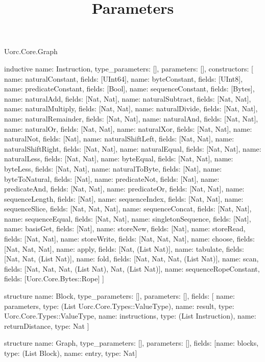 \begin{lexlean}{Uorc.Core.Graph}
\title{Parameters}
\begin{semanticmodule}
inductive{
  name: Instruction,
  type_parameters: [],
  parameters: [],
  constructors: [
    {name: naturalConstant, fields: [UInt64]},
    {name: byteConstant, fields: [UInt8]},
    {name: predicateConstant, fields: [Bool]},
    {name: sequenceConstant, fields: [Bytes]},
    {name: naturalAdd, fields: [Nat, Nat]},
    {name: naturalSubtract, fields: [Nat, Nat]},
    {name: naturalMultiply, fields: [Nat, Nat]},
    {name: naturalDivide, fields: [Nat, Nat]},
    {name: naturalRemainder, fields: [Nat, Nat]},
    {name: naturalAnd, fields: [Nat, Nat]},
    {name: naturalOr, fields: [Nat, Nat]},
    {name: naturalXor, fields: [Nat, Nat]},
    {name: naturalNot, fields: [Nat]},
    {name: naturalShiftLeft, fields: [Nat, Nat]},
    {name: naturalShiftRight, fields: [Nat, Nat]},
    {name: naturalEqual, fields: [Nat, Nat]},
    {name: naturalLess, fields: [Nat, Nat]},
    {name: byteEqual, fields: [Nat, Nat]},
    {name: byteLess, fields: [Nat, Nat]},
    {name: naturalToByte, fields: [Nat]},
    {name: byteToNatural, fields: [Nat]},
    {name: predicateNot, fields: [Nat]},
    {name: predicateAnd, fields: [Nat, Nat]},
    {name: predicateOr, fields: [Nat, Nat]},
    {name: sequenceLength, fields: [Nat]},
    {name: sequenceIndex, fields: [Nat, Nat]},
    {name: sequenceSlice, fields: [Nat, Nat, Nat]},
    {name: sequenceConcat, fields: [Nat, Nat]},
    {name: sequenceEqual, fields: [Nat, Nat]},
    {name: singletonSequence, fields: [Nat]},
    {name: basisGet, fields: [Nat]},
    {name: storeNew, fields: [Nat]},
    {name: storeRead, fields: [Nat, Nat]},
    {name: storeWrite, fields: [Nat, Nat, Nat]},
    {name: choose, fields: [Nat, Nat, Nat]},
    {name: apply, fields: [Nat, (List Nat)]},
    {name: tabulate, fields: [Nat, Nat, (List Nat)]},
    {name: fold, fields: [Nat, Nat, Nat, (List Nat)]},
    {name: scan, fields: [Nat, Nat, Nat, (List Nat), Nat, (List Nat)]},
    {name: sequenceRopeConstant, fields: [Uorc.Core.Bytes::Rope]}
  ]
}

structure{
  name: Block,
  type_parameters: [],
  parameters: [],
  fields: [
    {name: parameters, type: (List Uorc.Core.Types::ValueType)},
    {name: result, type: Uorc.Core.Types::ValueType},
    {name: instructions, type: (List Instruction)},
    {name: returnDistance, type: Nat}
  ]
}

structure{
  name: Graph,
  type_parameters: [],
  parameters: [],
  fields: [{name: blocks, type: (List Block)}, {name: entry, type: Nat}]
}


\end{semanticmodule}
\end{lexlean}
